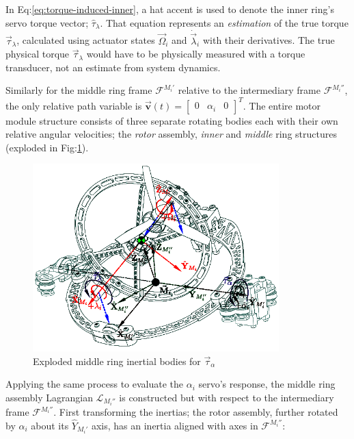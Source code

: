 \par
In Eq:\ref{eq:torque-induced-inner}, a hat accent is used to denote the inner ring's servo torque vector; $\hat{\tau}_\lambda$. That equation represents an \emph{estimation} of the true torque $\vec{\tau}_\lambda$, calculated using actuator states $\vec{\Omega}_i$ and $\dot{\vec{\lambda}}_i$ with their derivatives. The true physical torque $\vec{\tau}_\lambda$ would have to be physically measured with a torque transducer, not an estimate from system dynamics.
\par
Similarly for the middle ring frame $\mathcal{F}^{M_i'}$ relative to the intermediary frame $\mathcal{F}^{M_i''}$, the only relative path variable is $\vec{\mathbf{v}}(t)=\begin{bmatrix}0 & \alpha_i & 0\end{bmatrix}^T$. The entire motor module structure consists of three separate rotating bodies each with their own relative angular velocities; the \emph{rotor} assembly, \emph{inner} and \emph{middle} ring structures (exploded in Fig:\ref{fig:response-middle}).
\begin{figure}[htbp]
\centering
\includegraphics[width=0.85\textwidth]{figs/response-middle}
\caption{Exploded middle ring inertial bodies for $\vec{\tau}_{\alpha}$}
\label{fig:response-middle}
\vspace{-16pt}
\end{figure}
\par
Applying the same process to evaluate the $ \alpha_i$ servo's response, the middle ring assembly Lagrangian $\mathcal{L}_{M_i''}$ is constructed but with respect to the intermediary frame $\mathcal{F}^{M_i''}$. First transforming the inertias; the rotor assembly, further rotated by $\alpha_i$ about its $\hat{Y}_{M_i'}$ axis, has an inertia aligned with axes in $\mathcal{F}^{M_i''}$:
